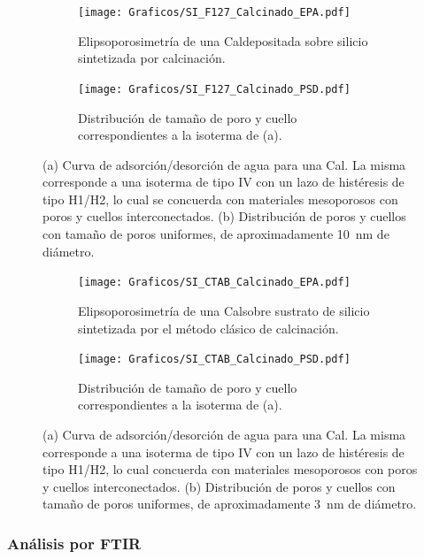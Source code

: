 		 		\begin{figure}[!t]
		     	  		\begin{subfigure}[t]{0.495\textwidth}
		     	  		\texttt{[image: Graficos/SI\_F127\_Calcinado\_EPA.pdf]}
						\caption{Elipsoporosimetría de una Cal\pdmF\space depositada sobre silicio sintetizada por calcinación.}
						\label{fig:F127_EPA}
						\end{subfigure}
						\begin{subfigure}[t]{0.495\textwidth}
		     	  		\texttt{[image: Graficos/SI\_F127\_Calcinado\_PSD.pdf]}
						\caption{Distribución de tamaño de poro y cuello correspondientes a la isoterma de (a).}
						\label{fig:F127_PSD}
						\end{subfigure}
						\caption[Elipsoporosimetría para sistemas Cal\pdmF.]{(a) Curva de adsorción/desorción de agua para una Cal\pdmF. La misma corresponde a una isoterma de tipo IV con un lazo de histéresis de tipo H1/H2, lo cual se concuerda con materiales mesoporosos con poros y cuellos interconectados. (b) Distribución de poros y cuellos con tamaño de poros uniformes, de aproximadamente \SI{10}{\nm} de diámetro.}
						\label{fig:F127_epa_psd_cal}
						\end{figure}
					
					\begin{figure}[!t]
		     	  		\begin{subfigure}[t]{0.495\textwidth}
		     	  		\texttt{[image: Graficos/SI\_CTAB\_Calcinado\_EPA.pdf]}
						\caption{Elipsoporosimetría de una Cal\pdmF\space sobre sustrato de silicio sintetizada por el método clásico de calcinación.}
						\label{fig:CTAB_EPA}
						\end{subfigure}
						\begin{subfigure}[t]{0.495\textwidth}
		     	  		\texttt{[image: Graficos/SI\_CTAB\_Calcinado\_PSD.pdf]}
						\caption{Distribución de tamaño de poro y cuello correspondientes a la isoterma de (a).}
						\label{fig:CTAB_PSD}
						\end{subfigure}
						\caption[Elipsoporosimetría para sistemas Cal\pdmC.]{(a) Curva de adsorción/desorción de agua para una Cal\pdmC. La misma corresponde a una isoterma de tipo IV con un lazo de histéresis de tipo H1/H2, lo cual concuerda con materiales mesoporosos con poros y cuellos interconectados. (b) Distribución de poros y cuellos con tamaño de poros uniformes, de aproximadamente \SI{3}{\nm} de diámetro.}
						\end{figure}

	    \subsubsection{Análisis por FTIR}\label{sec:Analisis_IR}

